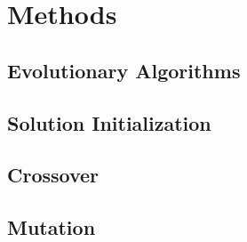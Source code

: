 \section{Methods}

\subsection{Evolutionary Algorithms}
\subsection{Solution Initialization}
\subsection{Crossover}
\subsection{Mutation}